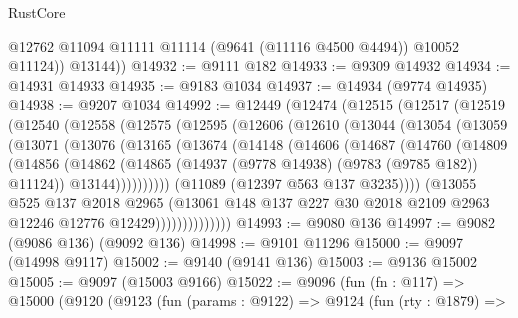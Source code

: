 \begin{lexlean}{RustCore}
\begin{coremodule}
            @12762
            @11094
            @11111
            @11114
            (@9641 (@11116 @4500 @4494))
            @10052
            @11124))
        @13144))
@14932 := @9111 @182
@14933 := @9309 @14932
@14934 := @14931 @14933
@14935 := @9183 @1034
@14937 := @14934 (@9774 @14935)
@14938 := @9207 @1034
@14992 := @12449
    (@12474
      (@12515
        (@12517
          (@12519
            (@12540
              (@12558
                (@12575
                  (@12595
                    (@12606
                      (@12610
                        (@13044
                          (@13054
                            (@13059
                              (@13071
                                (@13076
                                  (@13165
                                    (@13674
                                      (@14148
                                        (@14606
                                          (@14687
                                            (@14760
                                              (@14809
                                                (@14856
                                                  (@14862
                                                    (@14865
                                                      (@14937
                                                        (@9778 @14938)
                                                        (@9783 (@9785 @182))
                                                        @11124))
                                                    @13144))))))))))
                                (@11089 (@12397 @563 @137 @3235))))
                            (@13055
                              @525
                              @137
                              @2018
                              @2965
                              (@13061
                                @148
                                @137
                                @227
                                @30
                                @2018
                                @2109
                                @2963
                                @12246
                                @12776
                                @12429))))))))))))))
@14993 := @9080 @136
@14997 := @9082 (@9086 @136) (@9092 @136)
@14998 := @9101 @11296
@15000 := @9097 (@14998 @9117)
@15002 := @9140 (@9141 @136)
@15003 := @9136 @15002
@15005 := @9097 (@15003 @9166)
@15022 := @9096
    (fun (fn : @117) =>
    @15000
      (@9120
        (@9123
          (fun (params : @9122) =>
          @9124
            (fun (rty : @1879) =>

\end{coremodule}
\end{lexlean}
